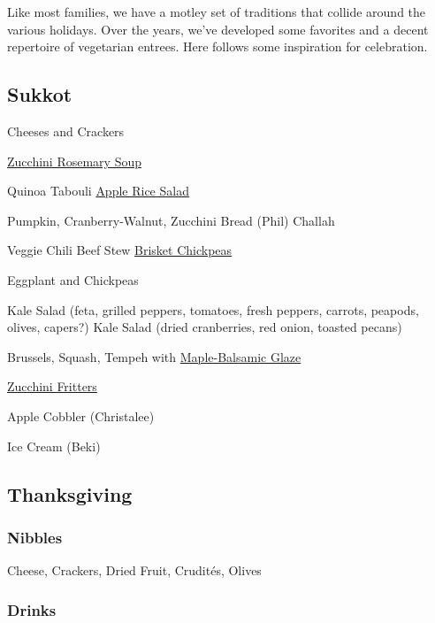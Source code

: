 Like most families, we have a motley set of traditions that collide around the various holidays. Over the years, we've developed some favorites and a decent repertoire of vegetarian entrees. Here follows some inspiration for celebration.

\begin{centering}
 \subsection*{Sukkot}

 Cheeses and Crackers

\hyperref[Zucchini Rosemary Soup]{Zucchini Rosemary Soup}

 Quinoa Tabouli \blt \hyperref[Apple Rice Salad]{Apple Rice Salad}

 Pumpkin, Cranberry-Walnut, Zucchini Bread (Phil) \blt Challah

 Veggie Chili \blt Beef Stew \blt \href{https://smittenkitchen.com/2020/09/tangy-braised-chickpeas/}{Brisket Chickpeas}

 Eggplant and Chickpeas

 Kale Salad (feta, grilled peppers, tomatoes, fresh peppers, carrots, peapods, olives, capers?) \blt Kale Salad (dried cranberries, red onion, toasted pecans)

 Brussels, Squash, Tempeh with \href{http://www.seriouseats.com/recipes/2012/11/roasted-brussels-sprouts-bacon-pecans-maple-balsamic-recipe.html}{Maple-Balsamic Glaze}

 \href{https://smittenkitchen.com/2011/08/zucchini-fritters/}{Zucchini Fritters}

 Apple Cobbler (Christalee)

 Ice Cream (Beki)

 \pagebreak
 \subsection*{Thanksgiving}

 \subsubsection*{Nibbles}

 Cheese, Crackers, Dried Fruit, Crudités, Olives

 \subsubsection*{Drinks}


\end{centering}
